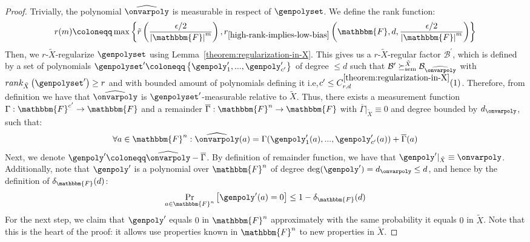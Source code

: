 \documentclass[10pt,a4paper]{article}
\newcommand{\definedas}[0]{\coloneqq}
\newcommand{\parens}[1]{\left( #1 \right)}
\newcommand{\set}[1]{\left\{ #1 \right\}}
\newcommand{\basefield}[0]{\mathbbm{F}}
\newcommand{\blocklength}[0]{n}
\newcommand{\field}[0]{\basefield^{\blocklength}}
\newcommand{\degree}[0]{d}
\newcommand{\funcdef}[3]{#1:#2\rightarrow#3}
\newcommand{\restrictfunc}[2]{#1|_{#2}}
\newcommand{\factor}[0]{\mathcal{B}}
\newcommand{\relsemrefine}[1]{\succeq^{#1}_{\text{sem}}}
\newcommand{\relativeremainder}[1]{\overline{#1}}
\newcommand{\variety}{{\tilde{X}}}
\newcommand{\lift}[1]{\widehat{#1}}
\newcommand{\relrank}[2]{rank_{#1} \parens{#2}}
\newcommand{\rankfunc}[0]{{{{r}}}}
\newcommand{\rankbiasfunc}[0]{{\tilde{r}}}
\newcommand{\abs}[1]{\left| #1 \right|}
\newcommand{\prex}[2]{\Pr_{#1}\left[ #2 \right]}
\newcommand{\normalizedcodedistance}[2]{\delta_{#1}(#2)}
\begin{document}
\begin{proof}
    Trivially, the polynomial $\lift{\onvarpoly}$ is measurable in respect of $\genpolyset$.
    \newline
    We define the rank function:
    \[
        \rankfunc(m) \definedas \max \set{
            \rankbiasfunc \parens {\dfrac{\epsilon / 2}{\abs{\basefield}^m}},
            \rankfunc_{\ref{high-rank-implies-low-bias}} \parens{\basefield, \degree, \dfrac{\epsilon / 2}{\abs{\basefield}^m}}}
    \]
    Then, we $\rankfunc$-$\variety$-regularize $\genpolyset$ using Lemma~{\ref{theorem:regularization-in-X}}.
    This gives us a $\rankfunc$-$\variety$-regular factor $\factor^\prime$, which is defined by a set of polynomials $\genpolyset^{\prime} \definedas \set{\genpoly^\prime_1,...,\genpoly^\prime_{c^\prime}}$
    of degree $\leq \degree$ such that $\factor^\prime \relsemrefine{\variety}\factor_{\lift{\onvarpoly}}$ with $\relrank{\variety}{\genpolyset^\prime} \geq \rankfunc$
    and with bounded amount of polynomials defining it i.e,$c^\prime \leq C_{\rankfunc, \degree}^{\ref{theorem:regularization-in-X}}(1)$.
    Therefore, from definition we have that $\lift{\onvarpoly}$ is $\genpolyset^\prime$-measurable relative to $\variety$.
    Thus, there exists a measurement function $\funcdef{\Gamma}{\basefield^{c^\prime}}{\basefield}$
    and a remainder $\funcdef{\relativeremainder{\Gamma}}{\field}{\basefield}$ with $\restrictfunc{\relativeremainder{\Gamma}}{\variety} \equiv 0$
    and degree bounded by $\degree_{\onvarpoly}$, such that:
    \[
        \forall a \in \field:
        \lift{\onvarpoly}(a) =
        \Gamma(\genpoly^\prime_1(a),...,\genpoly^\prime_{c^\prime}(a))
        + \relativeremainder{\Gamma}(a)
    \]
    Next, we denote $\genpoly^\prime \definedas \lift{\onvarpoly} - \relativeremainder{\Gamma}$.
    By definition of remainder function, we have that $\restrictfunc{\genpoly^\prime}{\variety} \equiv \onvarpoly$.
    Additionally, note that $\genpoly^\prime$ is a polynomial over $\field$ of degree $\deg(\genpoly^\prime) = \degree_{\onvarpoly} \leq \degree$,
    and hence by the definition of $\normalizedcodedistance{\basefield}{\degree}$:
    \begin{equation}\label{eq:polynomials-in-fn-are-bounded-away-from-zero-with-high-probability}
    \prex{a \in \field}{\genpoly^\prime(a) = 0} \leq 1 - \normalizedcodedistance{\basefield}{\degree}
    \end{equation}
    For the next step, we claim that $\genpoly^\prime$ equals $0$ in $\field$ approximately with the same probability it equals $0$ in $\variety$.
    Note that this is the heart of the proof: it allows use properties known in $\field$ to new properties in $\variety$.

\end{proof}
\end{document}
